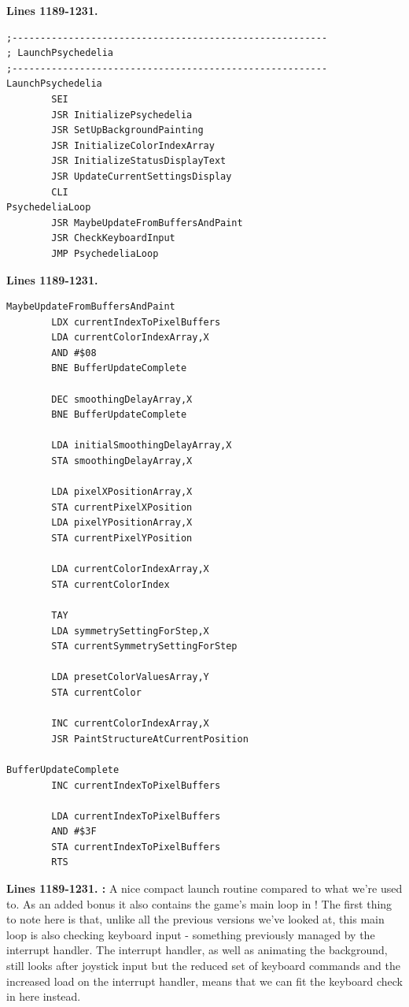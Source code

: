 

\clearpage
\textbf{Lines 1189-1231. } 
\begin{lstlisting}
;--------------------------------------------------------
; LaunchPsychedelia
;--------------------------------------------------------
LaunchPsychedelia
        SEI 
        JSR InitializePsychedelia
        JSR SetUpBackgroundPainting
        JSR InitializeColorIndexArray
        JSR InitializeStatusDisplayText
        JSR UpdateCurrentSettingsDisplay
        CLI 
PsychedeliaLoop   
        JSR MaybeUpdateFromBuffersAndPaint
        JSR CheckKeyboardInput
        JMP PsychedeliaLoop
\end{lstlisting}
\textbf{Lines 1189-1231. } 
\begin{lstlisting}[basicstyle=\ttfamily\scriptsize, caption=The routine responsible for painting patterns.]
MaybeUpdateFromBuffersAndPaint   
        LDX currentIndexToPixelBuffers
        LDA currentColorIndexArray,X
        AND #$08
        BNE BufferUpdateComplete

        DEC smoothingDelayArray,X
        BNE BufferUpdateComplete

        LDA initialSmoothingDelayArray,X
        STA smoothingDelayArray,X

        LDA pixelXPositionArray,X
        STA currentPixelXPosition
        LDA pixelYPositionArray,X
        STA currentPixelYPosition

        LDA currentColorIndexArray,X
        STA currentColorIndex

        TAY 
        LDA symmetrySettingForStep,X
        STA currentSymmetrySettingForStep

        LDA presetColorValuesArray,Y
        STA currentColor

        INC currentColorIndexArray,X
        JSR PaintStructureAtCurrentPosition

BufferUpdateComplete   
        INC currentIndexToPixelBuffers

        LDA currentIndexToPixelBuffers
        AND #$3F
        STA currentIndexToPixelBuffers
        RTS 
\end{lstlisting}
\clearpage

\textbf{Lines 1189-1231. :} A nice compact launch routine compared to what we're used to. As an added
bonus it also contains the game's main loop in ! The first thing to note here is that, unlike all the previous
versions we've looked at, this main loop is also checking keyboard input - something previously managed by the interrupt handler. The
interrupt handler, as well as animating the background, still looks after joystick input but the reduced set of keyboard commands and
the increased load on the interrupt handler, means that we can fit the keyboard check in here instead.

